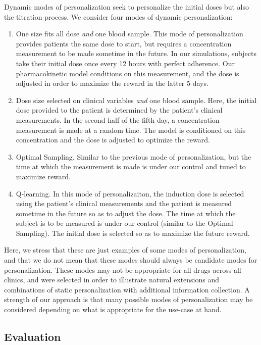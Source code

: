 Dynamic modes of personalization seek to personalize the initial doses but also the titration process.  We consider four modes of dynamic personalization:

\begin{enumerate}
	\item One size fits all dose \textit{and} one blood sample.  This mode of personalization provides patients the same dose to start, but requires a concentration measurement to be made sometime in the future.  In our simulations, subjects take their initial dose once every 12 hours with perfect adherence.  Our pharmacokinetic model conditions on this measurement, and the dose is adjusted in order to maximize the reward in the latter 5 days.
	
	\item Dose size selected on clinical variables \textit{and} one blood sample.  Here, the initial dose provided to the patient is determined by the patient's clinical measurements. In the second half of the fifth day, a concentration measurement is made at a random time. The model is conditioned on this concentration and the dose is adjusted to optimize the reward.
	
	\item Optimal Sampling.  Similar to the previous mode of personalization, but the time at which the measurement is made is under our control and tuned to maximize reward.
	
	\item Q-learning. In this mode of personalizaiton, the induction dose is selected using the patient's clinical measurements and the patient is measured sometime in the future so as to adjust the dose.  The time at which the subject is to be measured is under our control (similar to the Optimal Sampling).  The initial dose is selected so as to maximize the future reward.
\end{enumerate}

Here, we stress that these are just examples of some modes of personalization, and that we do not mean that these modes should always be candidate modes for personalization.  These modes may not be appropriate for all drugs across all clinics, and were selected in order to illustrate natural extensions and combinations of static personalization with additional information collection. A strength of our approach is that many possible modes of personalization may be considered depending on what is appropriate for the use-case at hand.

\subsection{Evaluation}

